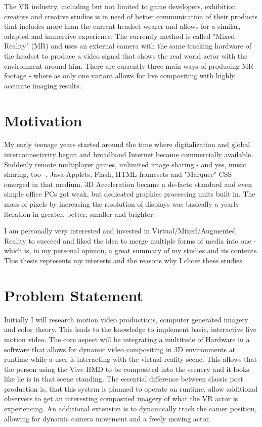 The VR industry, including but not limited to game developers, exhibition 
creators and creative studios is in need of better communication of their 
products that includes more than the current headset wearer and allows for a 
similar, adapted and immersive experience.
\newline
The currently method is called "Mixed Reality" (MR) and uses an external camera 
with the same tracking hardware of the headset to produce a video signal that 
shows the real world actor with the environment around him. There are currently 
three main ways of producing MR footage - where as only one variant allows for 
live compositing with highly accurate imaging results.


\section{Motivation}
\label{sec:intro:motivation}

My early teenage years started around the time where digitalization and global
interconnectivity begun and broadband Internet became commercially available.
Suddenly remote multiplayer games, unlimited image sharing - and yes, music
sharing, too -, Java-Applets, Flash, HTML framesets and "Marquee" CSS emerged in
that medium. 3D Acceleration became a de-facto standard and even simple office
PCs got weak, but dedicated graphics processing units built in. The mass of
pixels by increasing the resolution of displays was basically a yearly
iteration in greater, better, smaller and brighter.

I am personally very interested and invested in Virtual/Mixed/Augmented Reality 
to succeed and liked the idea to merge multiple forms of media into one - which 
is, in my personal opinion, a great summary of my studies and its contents. 
This thesis represents my interests and the reasons why I chose these studies.

\section{Problem Statement}

Initially I will research motion video productions, computer generated imagery 
and color theory. This leads to the knowledge to implement basic, interactive 
live motion video.
\newline
The core aspect will be integrating a multitude of Hardware in a software that 
allows for dynamic video compositing in 3D environments at runtime while a user 
is interacting with the virtual reality scene. This allows that the person 
using the Vive HMD to be composited into the scenery and it looks like he is in 
that scene standing. The essential difference between classic post production 
is, that this system is planned to operate on runtime, allow additional 
observers to get an interesting composited imagery of what the VR actor is 
experiencing.
\newline
An additional extension is to dynamically track the camer position, allowing 
for dynamic camera movement and a freely moving actor. 

